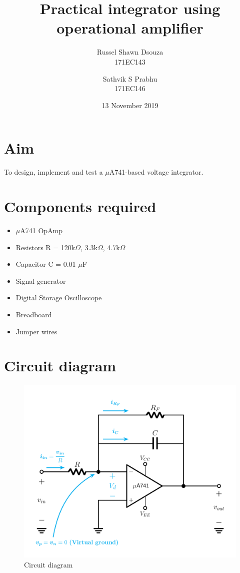 \documentclass[12pt, titlepage]{article}
\title{\textbf{Practical integrator using operational amplifier}}
\author{
  Russel Shawn Dsouza\\
  171EC143
  \and
  Sathvik S Prabhu\\
  171EC146
}
\date{13 November 2019}
\theoremstyle{definition}
\begin{document}
  \maketitle
  \thispagestyle{empty}

  \newpage
  \tableofcontents
  \thispagestyle{empty}

  \newpage
  \setcounter{page}{1}
  \section{Aim}
  To design, implement and test a $\mu$A741-based voltage integrator.


  \section*{Components required}
    \begin{itemize}
      \item $\mu$A741 OpAmp
      \item Resistors R = 120k$\Omega$, 3.3k$\Omega$, 4.7k$\Omega$
      \item Capacitor C = 0.01 $\mu$F
      \item Signal generator
      \item Digital Storage Oscilloscope
      \item Breadboard
      \item Jumper wires
    \end{itemize}


  \newpage
  \section{Circuit diagram}
    \begin{figure}[h]
      \centering
      \includegraphics[scale=0.25]{practical_integrator.png}
      \caption{Circuit diagram}
      \label{fig:theoretical_practical_integrator}
    \end{figure}
\end{document}
